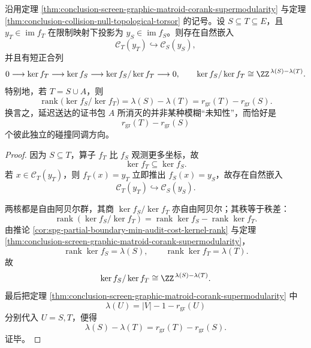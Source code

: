 \begin{theorem}[延迟补全的碰撞扭量商与秩削减律]\label{thm:conclusion-delayed-completion-collision-torsor-rank-law}
沿用定理 \ref{thm:conclusion-screen-graphic-matroid-corank-supermodularity} 与定理 \ref{thm:conclusion-collision-null-topological-torsor} 的记号。设 \(S\subseteq T\subseteq E\)，且 \(y_T\in\operatorname{im}f_T\) 在限制映射下投影为 \(y_S\in\operatorname{im}f_S\)。则存在自然嵌入
\[
\mathcal C_T(y_T)\hookrightarrow \mathcal C_S(y_S),
\]
并且有短正合列
\[
0\longrightarrow \ker f_T\longrightarrow \ker f_S\longrightarrow \ker f_S/\ker f_T\longrightarrow 0,
\qquad
\ker f_S/\ker f_T\cong \ZZ^{\,\lambda(S)-\lambda(T)}.
\]
特别地，若 \(T=S\cup A\)，则
\[
\operatorname{rank}\bigl(\ker f_S/\ker f_T\bigr)
=
\lambda(S)-\lambda(T)
=
r_{\mathrm{gr}}(T)-r_{\mathrm{gr}}(S).
\]
换言之，延迟送达的证书包 \(A\) 所消灭的并非某种模糊“未知性”，而恰好是
\[
r_{\mathrm{gr}}(T)-r_{\mathrm{gr}}(S)
\]
个彼此独立的碰撞同调方向。
\end{theorem}

\begin{proof}
因为 \(S\subseteq T\)，算子 \(f_T\) 比 \(f_S\) 观测更多坐标，故
\[
\ker f_T\subseteq \ker f_S.
\]
若 \(x\in\mathcal C_T(y_T)\)，则 \(f_T(x)=y_T\) 立即推出 \(f_S(x)=y_S\)，故存在自然嵌入
\[
\mathcal C_T(y_T)\hookrightarrow \mathcal C_S(y_S).
\]

两核都是自由阿贝尔群，其商 \(\ker f_S/\ker f_T\) 亦自由阿贝尔；其秩等于秩差：
\[
\operatorname{rank}(\ker f_S/\ker f_T)
=
\operatorname{rank}\ker f_S-\operatorname{rank}\ker f_T.
\]
由推论 \ref{cor:spg-partial-boundary-min-audit-cost-kernel-rank} 与定理 \ref{thm:conclusion-screen-graphic-matroid-corank-supermodularity}，
\[
\operatorname{rank}\ker f_S=\lambda(S),
\qquad
\operatorname{rank}\ker f_T=\lambda(T).
\]
故
\[
\ker f_S/\ker f_T\cong \ZZ^{\,\lambda(S)-\lambda(T)}.
\]
最后把定理 \ref{thm:conclusion-screen-graphic-matroid-corank-supermodularity} 中
\[
\lambda(U)=|V|-1-r_{\mathrm{gr}}(U)
\]
分别代入 \(U=S,T\)，便得
\[
\lambda(S)-\lambda(T)=r_{\mathrm{gr}}(T)-r_{\mathrm{gr}}(S).
\]
证毕。
\end{proof}

